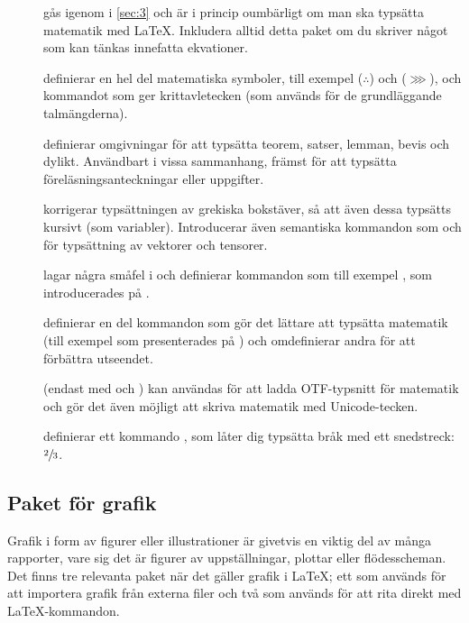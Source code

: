 \documentclass[10pt,../../a4.tex]{subfiles}
\begin{document}
\begin{description}
	\item[]
	gås igenom i \cref{sec:3} och är i princip oumbärligt om man ska
	typsätta matematik med \LaTeX. Inkludera alltid detta paket om du
	skriver något som kan tänkas innefatta ekvationer.

	\item[]
	definierar en hel del matematiska symboler, till exempel 
	 (\(\therefore\)) och  (\(\ggg\)), och 
	kommandot  som ger krittavletecken (som
	används för de grundläggande talmängderna).
	
	\item[]
	definierar omgivningar för att typsätta teorem, satser, lemman, bevis
	och dylikt. Användbart i vissa sammanhang, främst för att typsätta
	föreläsningsanteckningar eller uppgifter. 
	
	\item[{}]
	korrigerar typsättningen av grekiska bokstäver, så att även dessa typsätts
	kursivt (som variabler). Introducerar även semantiska kommandon som
	 och  för typsättning av vektorer
	och tensorer.
	
	\item[]
	lagar några småfel i  och definierar kommandon som till
	exempel , som introducerades på
	.

	\item[]
	definierar en del kommandon som gör det lättare att typsätta matematik
	(till exempel  som presenterades på )
	och omdefinierar andra för att förbättra utseendet.

	\item[{}]
		(endast med \XeTeX och )
	kan användas för att ladda \textsc{OTF}-typsnitt för matematik och
	gör det även möjligt att skriva matematik med Unicode-tecken.

	\item[{}]
	definierar ett kommando , som låter dig typsätta bråk
	med ett snedstreck: \(\sfrac{2}{3}\).
\end{description}

\subsection{Paket för grafik}
Grafik i form av figurer eller illustrationer är givetvis en viktig del
av många rapporter, vare sig det är figurer av uppställningar, plottar
eller flödesscheman. Det finns tre relevanta paket när det gäller grafik
i \LaTeX; ett som används för att importera grafik från externa filer och
två som används för att rita direkt med \LaTeX-kommandon.
\end{document}
